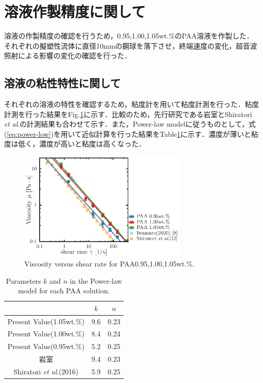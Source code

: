 \section{溶液作製精度に関して}

溶液の作製精度の確認を行うため，0.95,1.00,1.05wt.\%のPAA溶液を作製した．それぞれの擬塑性流体に直径10mmの鋼球を落下させ，終端速度の変化，超音波照射による影響の変化の確認を行った．

\subsection{溶液の粘性特性に関して}
それぞれの溶液の特性を確認するため，粘度計を用いて粘度計測を行った．粘度計測を行った結果をFig.\ref{fig:95-105}に示す．比較のため，先行研究である岩室\cite{ref:8}とShiratori \textit{et al}.\cite{ref:9}の計測結果も合わせて示す．また，Power-law modelに従うものとして，式(\ref{eq:power-low})を用いて近似計算を行った結果をTable\ref{table:005_knParameter}に示す．濃度が薄いと粘度は低く，濃度が高いと粘度は高くなった．

\begin{figure}[H]
    \includegraphics[width=0.72\textwidth]{X-Appendix/concentration/viscosity/viscosity.eps}
    \caption{Viscosity versus shear rate for PAA0.95,1.00,1.05wt.\%.}
    \label{fig:95-105}
\end{figure}

\begin{table}[H]
    \centering
    \caption{Parameters $k$ and $n$ in the Power-law model for each PAA solution.}
    \label{table:005_knParameter}
    \begin{tabular}{c|c|c} \hline
                                                     & $k$ & $n$  \\ \hline \hline
        Present Value(1.05wt.\%)                     & 9.6 & 0.23 \\
        Present Value(1.00wt.\%)                     & 8.4 & 0.24 \\
        Present Value(0.95wt.\%)                     & 5.2 & 0.25 \\
        岩室\cite{ref:8}                             & 9.4 & 0.23 \\
        Shiratori \textit{et al}.(2016)\cite{ref:10} & 5.9 & 0.25 \\ \hline
    \end{tabular}
\end{table}

